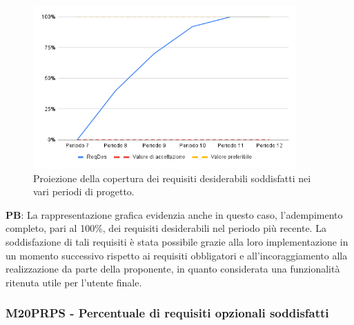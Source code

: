 \begin{figure}[H]
    \centering
    \includegraphics[width=0.9\textwidth]{../Images/PianoDiQualifica/PRDS.png}
    \caption{Proiezione della copertura dei requisiti desiderabili soddisfatti nei vari periodi di progetto.}
    \label{fig:11}
\end{figure}

\vspace{0.2cm}

\textbf{PB}: La rappresentazione grafica evidenzia anche in questo caso, l'adempimento completo, pari al 100\%, dei requisiti desiderabili nel periodo più recente. La soddisfazione di tali requisiti è stata possibile grazie alla loro implementazione in un momento successivo rispetto ai requisiti obbligatori e all’incoraggiamento alla realizzazione da parte della proponente, in quanto considerata una funzionalità ritenuta utile per l’utente finale.

\subsubsection{M20PRPS - Percentuale di requisiti opzionali soddisfatti}